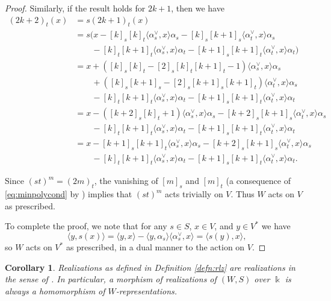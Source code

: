 \documentclass{amsart}
\theoremstyle{plain}
\newtheorem{cor}[thm]{Corollary}
\theoremstyle{definition}
\theoremstyle{remark}
\numberwithin{equation}{section}
\begin{document}
\begin{proof}
Similarly, if the result holds for $2k+1$, then we have
\begin{align*}
(2k+2)_t(x)& =s(2k+1)_t(x) \\
& =s(x - [k]_s [k]_t \langle \alpha_s^\vee, x\rangle \alpha_s - [k]_s [k+1]_s \langle \alpha_t^\vee, x\rangle \alpha_s \\
& \quad \quad {} - [k]_t [k+1]_t \langle \alpha_s^\vee, x\rangle \alpha_t - [k+1]_s [k+1]_t \langle \alpha_t^\vee, x\rangle \alpha_t) \\
& =x + ([k]_s [k]_t - [2]_s [k]_t [k+1]_t - 1)\langle \alpha_s^\vee, x\rangle \alpha_s \\
& \quad \quad {} + ([k]_s [k+1]_s - [2]_s [k+1]_s [k+1]_t)\langle \alpha_t^\vee, x\rangle \alpha_s \\
& \quad \quad {} - [k]_t [k+1]_t \langle \alpha_s^\vee, x\rangle \alpha_t - [k+1]_s [k+1]_t \langle \alpha_t^\vee, x\rangle \alpha_t \\
& =x - ([k+2]_s [k]_t + 1)\langle \alpha_s^\vee, x\rangle \alpha_s - [k+2]_s [k+1]_s \langle \alpha_t^\vee, x\rangle \alpha_s \\
& \quad \quad {} - [k]_t [k+1]_t \langle \alpha_s^\vee, x\rangle \alpha_t - [k+1]_s [k+1]_t \langle \alpha_t^\vee, x\rangle \alpha_t \\
& =x - [k+1]_s [k+1]_t \langle \alpha_s^\vee, x\rangle \alpha_s - [k+2]_s [k+1]_s \langle \alpha_t^\vee, x\rangle \alpha_s \\
& \quad \quad {} - [k]_t [k+1]_t \langle \alpha_s^\vee, x\rangle \alpha_t - [k+1]_s [k+1]_t \langle \alpha_t^\vee, x\rangle \alpha_t \text{.}
\end{align*}

Since $(st)^m = (2m)_t$, the vanishing of $[m]_s$ and $[m]_t$ (a consequence of \eqref{eq:minpolycond} by \cite[Lemma~3.2]{2colJW}) implies that $(st)^m$ acts trivially on $V$. 
Thus $W$ acts on $V$ as prescribed.

To complete the proof, we note that for any $s \in S$, $x \in V$, and $y \in V^\ast$ we have
\begin{equation*}
\langle y, s(x) \rangle = \langle y, x \rangle - \langle y,\alpha_s \rangle \langle \alpha_s^\vee, x\rangle = \langle s(y), x\rangle \text{,}
\end{equation*}
so $W$ acts on $V^\ast$ as prescribed, in a dual manner to the action on $V$.
\end{proof}

\begin{cor}
Realizations as defined in Definition \ref{defn:rlz} are realizations in the sense of \cite[Definition~5.1]{2colJW}. 
In particular, a morphism of realizations of $(W,S)$ over $\Bbbk$ is always a homomorphism of $W$-representations.
\end{cor}
\end{document}
